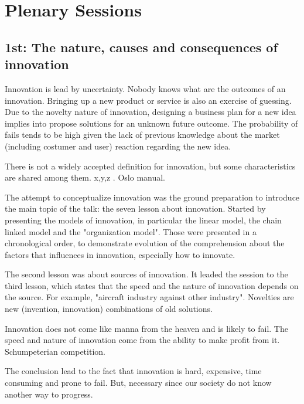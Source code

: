 \section{Plenary Sessions}

\subsection{1st: The nature, causes and consequences of innovation}

Innovation is lead by uncertainty. Nobody knows what are the outcomes of an innovation.
Bringing up a new product or service is also an exercise of guessing. 
Due to the novelty nature of innovation, designing a business plan for a new idea implies into propose solutions for an unknown future outcome. 
The probability of fails tends to be high given the lack of previous knowledge about the market (including costumer and user) reaction regarding the new idea.

There is not a widely accepted definition for innovation, but some characteristics are shared among them. x,y,z . Oslo manual.

The attempt to conceptualize innovation was the ground preparation to introduce the main topic of the talk: the seven lesson about innovation. 
Started by presenting the models of innovation, in particular the linear model, the chain linked model and the "organization model". 
Those were presented in a chronological order, to demonstrate evolution of the comprehension about the factors that influences in innovation, especially how to innovate. 

The second lesson was about sources of innovation. 
It leaded the session to the third lesson, which states that the speed and the nature of innovation depends on the source. 
For example, "aircraft industry against other industry". 
Novelties are new (invention, innovation) combinations of old solutions. 

Innovation does not come like manna from the heaven and is likely to fail. 
The speed and nature of innovation come from the ability to make profit from it. 
Schumpeterian competition.

The conclusion lead to the fact that innovation is hard, expensive, time consuming and prone to fail. But, necessary since our society do not know another way to progress.



